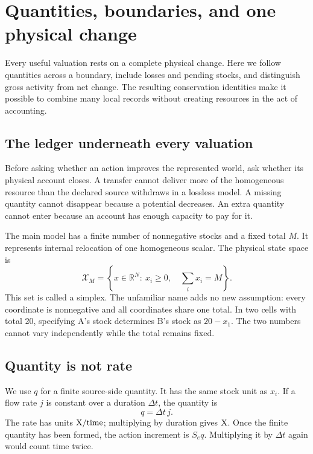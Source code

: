 \chapter{Quantities, boundaries, and one physical change}\label{ch:conservation}

Every useful valuation rests on a complete physical change. Here we follow quantities across a boundary, include losses and pending stocks, and distinguish gross activity from net change. The resulting conservation identities make it possible to combine many local records without creating resources in the act of accounting.


\section{The ledger underneath every valuation}
Before asking whether an action improves the represented world, ask whether its physical account closes. A transfer cannot deliver more of the homogeneous resource than the declared source withdraws in a lossless model. A missing quantity cannot disappear because a potential decreases. An extra quantity cannot enter because an account has enough capacity to pay for it.

The main model has a finite number of nonnegative stocks and a fixed total \(M\). It represents internal relocation of one homogeneous scalar. The physical state space is
\begin{equation}
 \mathcal{X}_M=\left\{x\in\mathbb{R}^N:\ x_i\geq0,\quad
                         \sum_i x_i=M\right\}.
\end{equation}
This set is called a simplex. The unfamiliar name adds no new assumption: every coordinate is nonnegative and all coordinates share one total. In two cells with total 20, specifying A's stock determines B's stock as \(20-x_1\). The two numbers cannot vary independently while the total remains fixed.

\section{Quantity is not rate}
We use \(q\) for a finite source-side quantity. It has the same stock unit as \(x_i\). If a flow rate \(j\) is constant over a duration \(\Delta t\), the quantity is
\begin{equation}
 q=\Delta t\,j.
\end{equation}
The rate has units \(\mathrm{X}/\text{time}\); multiplying by duration gives \(\mathrm{X}\). Once the finite quantity has been formed, the action increment is \(S_e q\). Multiplying it by \(\Delta t\) again would count time twice.

